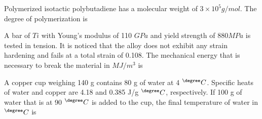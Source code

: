 \iffalse
\title{2014-XE-14-26}
\author{EE24BTECH11001 -  ADITYA TRIPATHY}
\section{xe}
\chapter{2014}
\fi
    \item 
        Polymerized isotactic polybutadiene has a molecular weight of $3 \times 10^5 g/mol$. The degree of
        polymerization is
        \hfill{}
        \\
    \item  A bar of $Ti$ with Young's modulus of 110 $GPa$ and yield strength of $880 MPa$ is tested in tension. It
        is noticed that the alloy does not exhibit any strain hardening and fails at a total strain of 0.108. The
        mechanical energy that is necessary to break the material in $MJ/m^3$ is		
        \hfill{}
        \\
    \item A copper cup weighing 140 g contains 80 g of water at 4 $^{\degree}C$. Specific heats of water and copper are
        4.18 and 0.385 J/g $^{\degree}C$, respectively. If 100 g of water that is at 90 $^{\degree}C$ is added to the cup, the final
        temperature of water in $^{\degree}C$ is
        \hfill{}
        \\

